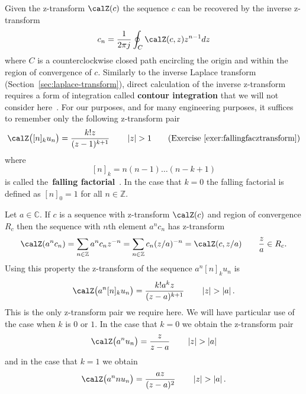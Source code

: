 \documentclass[11pt,a4paper]{book}
\theoremstyle{plain}
\numberwithin{equation}{section}
\newcommand{\ints}{{\mathbb Z}}
\newcommand{\complex}{{\mathbb C}}
\newcommand{\term}{\textbf}
\newcommand{\abs}[1]{\left\vert #1 \right\vert}
\begin{document}
\newcommand{\stirling}[2]{\genfrac{[}{]}{0pt}{}{#1}{#2}}
\newcommand{\eulerian}[2]{\genfrac{\langle}{\rangle}{0pt}{}{#1}{#2}}

Given the z-transform $\calZ(c)$ the sequence $c$ can be recovered by the inverse z-transform
\[
c_n = \frac{1}{2\pi j} \oint_C \calZ(c,z) z^{n-1} dz
\]
where $C$ is a counterclockwise closed path encircling the origin and within the region of convergence of $c$.  Similarly to the inverse Laplace transform (Section~\ref{sec:laplace-transform}), direct calculation of the inverse z-transform requires a form of integration called \term{contour integration} that we will not consider here~\citep{Stewart_ComplexAnalysis_2004}.  For our purposes, and for many engineering purposes, it suffices to remember only the following z-transform pair 
\[
\calZ\big( [n]_k u_n \big) = \frac{k! z }{(z - 1)^{k+1}} \qquad \abs{z} > 1 \qquad \text{(Exercise~\ref{exer:fallingfacztransform})}
\]
where
\[
[n]_k = n (n-1) \dots (n-k+1)
\]
is called the~\term{falling factorial}~\cite[p. 48]{concretemath_1994}.  In the case that $k=0$ the falling factorial is defined as $[n]_0 = 1$ for all $n\in\ints$.  

Let $a \in \complex$.  If $c$ is a sequence with z-transform $\calZ(c)$ and region of convergence $R_c$ then the sequence with $n$th element $a^nc_n$ has z-transform 
\[
\calZ(a^n c_n) = \sum_{n \in \ints} a^n c_n z^{-n} = \sum_{n \in \ints} c_n (z/a)^{-n} = \calZ(c, z/a) \qquad \frac{z}{a} \in R_c.
\]
Using this property the z-transform of the sequence $a^n [n]_k u_n$ is
\begin{equation}\label{eeq:onlyztrans}
\calZ\big( a^n [n]_k u_n \big) = \frac{k! a^k z }{(z - a)^{k+1}} \qquad \abs{z} > \abs{a}.
\end{equation}
This is the only z-transform pair we require here.  We will have particular use of the case when $k$ is $0$ or $1$.  In the case that $k=0$ we obtain the z-transform pair
\[
\calZ\big( a^n u_n \big) = \frac{ z }{z - a} \qquad \abs{z} > \abs{a}
\]
and in the case that $k=1$ we obtain
\[
\calZ\big( a^n n u_n \big) = \frac{ a z }{(z - a)^{2}} \qquad \abs{z} > \abs{a}.
\]
\end{document}
